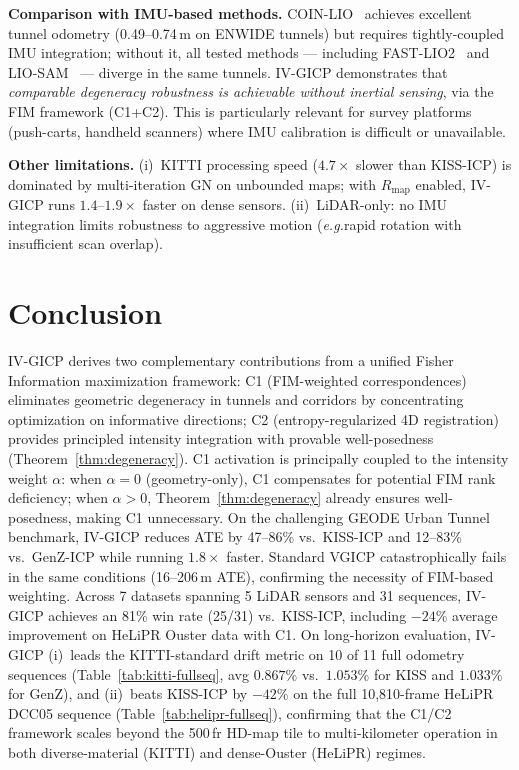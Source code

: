 \documentclass[journal,letterpaper,10pt]{IEEEtran}
\newcommand{\eg}{\textit{e.g.}}
\begin{document}
\textbf{Comparison with IMU-based methods.}
COIN-LIO~\cite{pfreundschuh2024coinlio} achieves excellent tunnel
odometry (0.49--0.74\,m on ENWIDE tunnels) but requires tightly-coupled
IMU integration; without it, all tested methods --- including
FAST-LIO2~\cite{xu2022fastlio2} and LIO-SAM~\cite{shan2020liosam}
--- diverge in the same tunnels.
IV-GICP demonstrates that \emph{comparable degeneracy robustness is
achievable without inertial sensing}, via the FIM framework (C1+C2).
This is particularly relevant for survey platforms (push-carts,
handheld scanners) where IMU calibration is difficult or unavailable.

\textbf{Other limitations.}
(i)~KITTI processing speed ($4.7\times$ slower than KISS-ICP) is
dominated by multi-iteration GN on unbounded maps; with
$R_{\mathrm{map}}$ enabled, IV-GICP runs $1.4$--$1.9\times$ faster
on dense sensors.
(ii)~LiDAR-only: no IMU integration limits robustness to aggressive
motion (\eg rapid rotation with insufficient scan overlap).

\section{Conclusion}\label{sec:conclusion}

IV-GICP derives two complementary contributions from a unified
Fisher Information maximization framework:
C1 (FIM-weighted correspondences) eliminates geometric degeneracy
in tunnels and corridors by concentrating optimization on informative
directions;
C2 (entropy-regularized 4D registration) provides principled intensity
integration with provable well-posedness (Theorem~\ref{thm:degeneracy}).
C1 activation is principally coupled to the intensity weight $\alpha$:
when $\alpha{=}0$ (geometry-only), C1 compensates for potential FIM
rank deficiency; when $\alpha{>}0$, Theorem~\ref{thm:degeneracy}
already ensures well-posedness, making C1 unnecessary.
On the challenging GEODE Urban Tunnel benchmark, IV-GICP reduces ATE
by 47--86\% vs.\ KISS-ICP and 12--83\% vs.\ GenZ-ICP while running
$1.8\times$ faster.
Standard VGICP catastrophically fails in the same conditions
(16--206\,m ATE), confirming the necessity of FIM-based weighting.
Across 7 datasets spanning 5 LiDAR sensors and 31 sequences, IV-GICP
achieves an 81\% win rate (25/31) vs.\ KISS-ICP, including $-24\%$
average improvement on HeLiPR Ouster data with C1.
On long-horizon evaluation, IV-GICP (i)~leads the KITTI-standard drift
metric on 10 of 11 full odometry sequences
(Table~\ref{tab:kitti-fullseq}, avg $0.867\%$ vs.\ $1.053\%$ for KISS
and $1.033\%$ for GenZ), and (ii)~beats KISS-ICP by $-42\%$ on the full
10{,}810-frame HeLiPR DCC05 sequence
(Table~\ref{tab:helipr-fullseq}), confirming that the C1/C2 framework
scales beyond the 500\,fr HD-map tile to multi-kilometer operation
in both diverse-material (KITTI) and dense-Ouster (HeLiPR) regimes.
\end{document}
